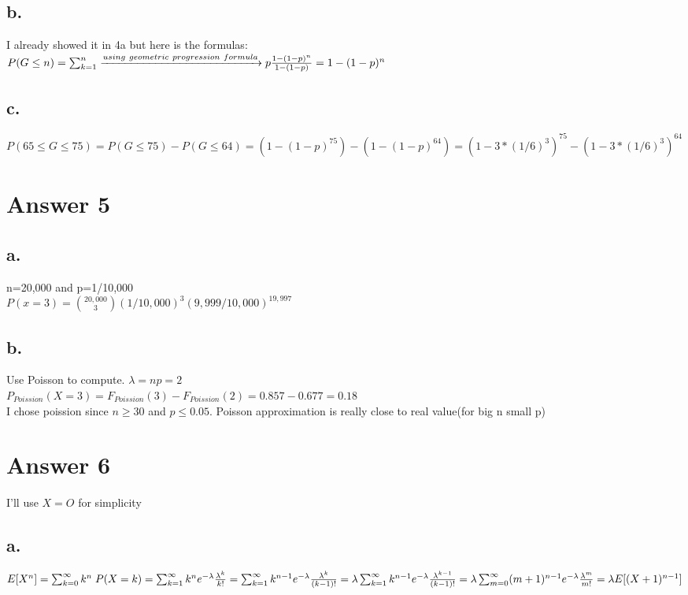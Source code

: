 \documentclass[12pt]{article}
\begin{document}
\subsection*{b.}
I already showed it in 4a but here is the formulas: \\
$P(G \leq n)= \sum_{k=1}^{n} \xrightarrow{using\ geometric\ progression\ formula}  p{1-(1-p)^{n} \over1-(1-p)}=1-(1-p)^{n}$\\
\subsection*{c.}
$P(65 \leq G \leq 75)=P(G\leq 75)-P(G\leq 64)=(1-(1-p)^{75})-(1-(1-p)^{64})=(1-3*(1/6)^3)^{75}-(1-3*(1/6)^3)^{64}$
\section*{Answer 5}

\subsection*{a.}
n=20,000 and p=1/10,000 \\
$P(x=3)=\binom{20,000}{3}(1/10,000)^3(9,999/10,000)^{19,997} $ 
\subsection*{b.}
Use Poisson to compute.
$\lambda=np=2$ \\
$P_{Poission}(X=3)=F_{Poission}(3)-F_{Poission}(2)=0.857-0.677=0.18$ \\
I chose poission since $n \geq 30$ and $p\leq 0.05$. Poisson approximation is really close to real value(for big n small p)


\section*{Answer 6}
I'll use $X=O$ for simplicity\\
\subsection*{a.}

$
E[X^n]  = \sum_{k=0}^\infty k^n \; P(X=k) = \sum_{k=1}^\infty k^n  e^{-\lambda}  \frac{\lambda^k}{k!} 
 = \sum_{k=1}^\infty k^{n-1}  e^{-\lambda}  \frac{\lambda^k}{(k-1)!} 
 = \lambda \sum_{k=1}^\infty k^{n-1}  e^{-\lambda}  \frac{\lambda^{k-1}}{(k-1)!} 
 = \lambda \sum_{m=0}^\infty (m+1)^{n-1}  e^{-\lambda}  \frac{ \lambda^m}{m!}\\
 = \lambda E[(X+1)^{n-1}]
$
\end{document}
